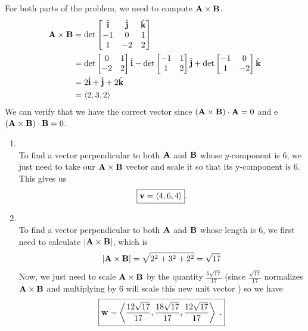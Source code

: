 \begin{solution} For both parts of the problem, we need to compute \( \vb{A} \times \vb{B} \). 
    \begin{align*}
        \vb{A} \times \vb{B} &= \mathrm{det} \begin{bmatrix}
            \hat{\vb{i}} & \hat{\vb{j}} & \hat{\vb{k}}\\
            -1 & 0 & 1\\
            1 & -2 & 2\\
        \end{bmatrix} \\
        &= \mathrm{det} \begin{bmatrix}
            0  & 1 \\
            -2  & 2 \\
        \end{bmatrix} \hat{\vb{i}} - \mathrm{det} \begin{bmatrix}
            -1  & 1 \\
            1  & 2 \\
        \end{bmatrix} \hat{\vb{j}} + \mathrm{det} \begin{bmatrix}
            -1  & 0 \\
            1 & -2 \\
        \end{bmatrix} \hat{\vb{k}} \\
        &= 2 \hat{\vb{i}} + \hat{\vb{j}} + 2 \hat{\vb{k}}\\
        &= \left< 2,3,2 \right>
    \end{align*}
    We can verify that we have the correct vector since \( \left( \vb{A} \times \vb{B} \right) \cdot \vb{A} = 0\) and e \( \left( \vb{A} \times \vb{B} \right) \cdot \vb{B} = 0\).
    \begin{enumerate}[label=\textbf{\roman*)}]
        \item $ $\\ 
        To find a vector perpendicular to both \( \vb{A} \) and \( \vb{B} \) whose \( y \)-component is \( 6 \), we just need to take our \( \vb{A} \times \vb{B} \) vector and scale it so that its y-component is \( 6 \). This gives us \[ \boxed{\vb{v} = \left< 4,6,4 \right>} .\]
        \item $ $\\ 
        To find a vector perpendicular to both \( \vb{A} \) and \( \vb{B} \) whose length is \( 6 \), we first need to calculate \( \abs{\vb{A} \times \vb{B}} \), which is 
        \[  \abs{\vb{A} \times \vb{B}}= \sqrt{2^{2} + 3^{2} + 2^{2}} = \sqrt{17} \]
        Now, we just need to scale \(  \vb{A} \times \vb{B} \) by the quantity \( \frac{6 \sqrt{17}}{17} \) (since \( \frac{\sqrt{17 }}{17} \) normalizes \( \vb{A} \times \vb{B}   \) and multiplying by \( 6 \) will scale this new unit vector ) so we have 
        \[ \boxed{\vb{w} = \left<  \frac{12 \sqrt{17}}{17},\frac{18 \sqrt{17}}{17}, \frac{12 \sqrt{17}}{17}  \right> \text{ .}} \]
    \end{enumerate}    
\end{solution}
